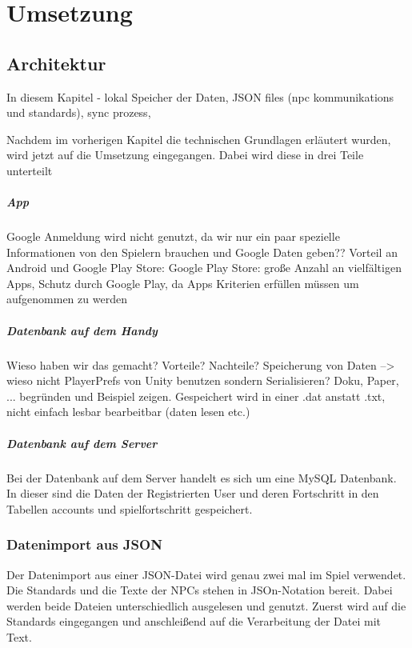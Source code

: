 \chapter{Umsetzung}

\section{Architektur}

In diesem Kapitel - lokal Speicher der Daten, JSON files (npc kommunikations und standards), sync prozess, 
	
Nachdem im vorherigen Kapitel die technischen Grundlagen erläutert wurden, wird jetzt auf die Umsetzung eingegangen. Dabei wird diese in drei Teile unterteilt
	
\paragraph{App}
Google Anmeldung wird nicht genutzt, da wir nur ein paar spezielle Informationen von den Spielern brauchen und Google Daten geben??
Vorteil an Android und Google Play Store: Google Play Store: große Anzahl an vielfältigen Apps, Schutz durch Google Play, da Apps Kriterien erfüllen müssen um aufgenommen zu werden
	
\paragraph{Datenbank auf dem Handy}
Wieso haben wir das gemacht? Vorteile? Nachteile?
Speicherung von Daten --> wieso nicht PlayerPrefs von Unity benutzen sondern Serialisieren? Doku, Paper, ... begründen und Beispiel zeigen. Gespeichert wird in einer .dat anstatt .txt, nicht einfach lesbar bearbeitbar (daten lesen etc.)
		
\paragraph{Datenbank auf dem Server}
Bei der Datenbank auf dem Server handelt es sich um eine MySQL Datenbank. In dieser sind die Daten der Registrierten User und deren Fortschritt in den Tabellen accounts und spielfortschritt gespeichert.

\subsection{Datenimport aus JSON}
Der Datenimport aus einer JSON-Datei wird genau zwei mal im Spiel verwendet. Die Standards und die Texte der NPCs stehen in JSOn-Notation bereit. Dabei werden beide Dateien unterschiedlich ausgelesen und genutzt. Zuerst wird auf die Standards eingegangen und anschleißend auf die Verarbeitung der Datei mit Text. 
	
